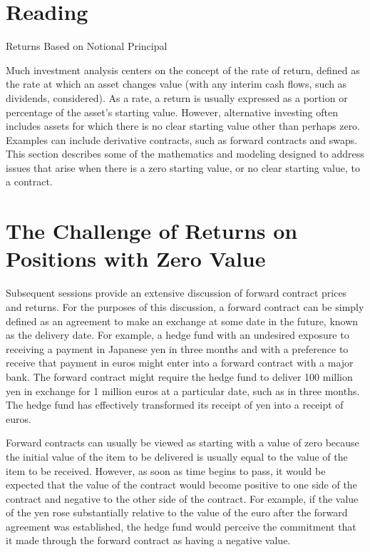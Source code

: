 \documentclass[11pt]{article}
\begin{document}
\section*{Reading}
Returns Based on Notional Principal

Much investment analysis centers on the concept of the rate of return, defined as the rate at which an asset changes value (with any interim cash flows, such as dividends, considered). As a rate, a return is usually expressed as a portion or percentage of the asset's starting value. However, alternative investing often includes assets for which there is no clear starting value other than perhaps zero. Examples can include derivative contracts, such as forward contracts and swaps. This section describes some of the mathematics and modeling designed to address issues that arise when there is a zero starting value, or no clear starting value, to a contract.

\section*{The Challenge of Returns on Positions with Zero Value}
Subsequent sessions provide an extensive discussion of forward contract prices and returns. For the purposes of this discussion, a forward contract can be simply defined as an agreement to make an exchange at some date in the future, known as the delivery date. For example, a hedge fund with an undesired exposure to receiving a payment in Japanese yen in three months and with a preference to receive that payment in euros might enter into a forward contract with a major bank. The forward contract might require the hedge fund to deliver 100 million yen in exchange for 1 million euros at a particular date, such as in three months. The hedge fund has effectively transformed its receipt of yen into a receipt of euros.

Forward contracts can usually be viewed as starting with a value of zero because the initial value of the item to be delivered is usually equal to the value of the item to be received. However, as soon as time begins to pass, it would be expected that the value of the contract would become positive to one side of the contract and negative to the other side of the contract. For example, if the value of the yen rose substantially relative to the value of the euro after the forward agreement was established, the hedge fund would perceive the commitment that it made through the forward contract as having a negative value.
\end{document}
